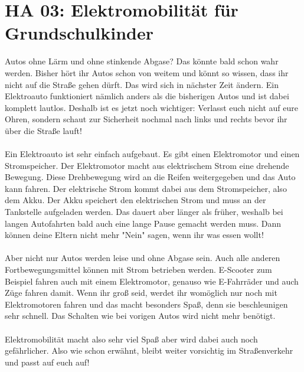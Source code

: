 \section{HA 03: Elektromobilität für Grundschulkinder}
  Autos ohne Lärm und ohne stinkende Abgase? Das könnte bald schon wahr werden. Bisher hört ihr Autos schon von weitem und könnt so wissen, dass ihr nicht auf die Straße gehen dürft. Das wird sich in nächster Zeit ändern. Ein Elektroauto funktioniert nämlich anders als die bisherigen Autos und ist dabei komplett lautlos. Deshalb ist es jetzt noch wichtiger: Verlasst euch nicht auf eure Ohren, sondern schaut zur Sicherheit nochmal nach links und rechts bevor ihr über die Straße lauft!\\\\
  Ein Elektroauto ist sehr einfach aufgebaut. Es gibt einen Elektromotor und einen Stromspeicher. Der Elektromotor macht aus elektrischem Strom eine drehende Bewegung. Diese Drehbewegung wird an die Reifen weitergegeben und das Auto kann fahren. Der elektrische Strom kommt dabei aus dem Stromspeicher, also dem Akku. Der Akku speichert den elektrischen Strom und muss an der Tankstelle aufgeladen werden. Das dauert aber länger als früher, weshalb bei langen Autofahrten bald auch eine lange Pause gemacht werden muss. Dann können deine Eltern nicht mehr "Nein" sagen, wenn ihr was essen wollt!\\\\
  Aber nicht nur Autos werden leise und ohne Abgase sein. Auch alle anderen Fortbewegungsmittel können mit Strom betrieben werden. E-Scooter zum Beispiel fahren auch mit einem Elektromotor, genauso wie E-Fahrräder und auch Züge fahren damit. Wenn ihr groß seid, werdet ihr womöglich nur noch mit Elektromotoren fahren und das macht besonders Spaß, denn sie beschleunigen sehr schnell. Das Schalten wie bei vorigen Autos wird nicht mehr benötigt.\\\\
  Elektromobilität macht also sehr viel Spaß aber wird dabei auch noch gefährlicher. Also wie schon erwähnt, bleibt weiter vorsichtig im Straßenverkehr und passt auf euch auf!
